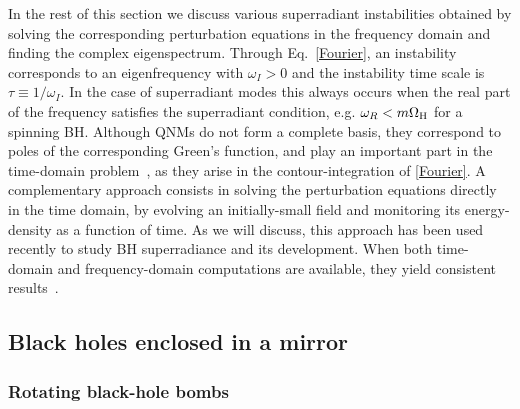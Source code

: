 \documentclass[11pt]{article}
\numberwithin{equation}{section} %
\begin{document}
In the rest of this section we discuss various superradiant instabilities obtained by solving the corresponding perturbation equations in the frequency domain and finding the complex eigenspectrum. Through Eq.~\eqref{Fourier}, an instability corresponds to an eigenfrequency with $\omega_I>0$ and the instability time scale is $\tau\equiv1/\omega_I$. In the case of superradiant modes this always occurs when the real part of the frequency satisfies the superradiant condition, e.g. $\omega_R<m\Omega_{\rm H}$ for a spinning BH. Although QNMs do not form a complete basis, they correspond to poles of the corresponding Green's function, and play 
an important part in the time-domain problem~\cite{Berti:2009kk}, as they arise in the contour-integration of \eqref{Fourier}.
A complementary approach consists in solving the perturbation equations directly in the time domain, by evolving an initially-small field and monitoring its energy-density as a function of time. As we will discuss, this approach has been used recently to study BH superradiance and its development. When both time-domain and frequency-domain computations are available, they yield consistent results~\cite{Dolan:2012yt,Witek:2012tr}.

\subsection{Black holes enclosed in a mirror}\label{sec:mirror}
\subsubsection{Rotating black-hole bombs}
\end{document}
